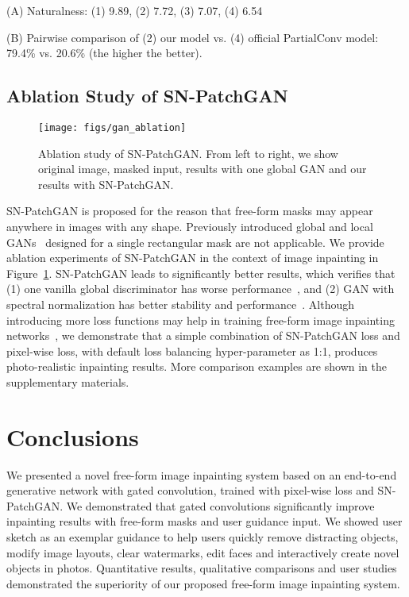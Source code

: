\documentclass[10pt,twocolumn,letterpaper]{article}
\begin{document}
(A) Naturalness: (1) 9.89, (2) 7.72, (3) 7.07, (4) 6.54

(B) Pairwise comparison of (2) our model vs. (4) official PartialConv model: 79.4\% vs. 20.6\% (the higher the better).

\subsection{Ablation Study of SN-PatchGAN}
\begin{figure}[ht]
  \centering
  \texttt{[image: figs/gan\_ablation]}
  \vspace{-6mm}
  \caption{Ablation study of SN-PatchGAN. From left to right, we show original image, masked input, results with one global GAN and our results with SN-PatchGAN.}
  \label{figs:gan_ablation}
\end{figure}

SN-PatchGAN is proposed for the reason that free-form masks may appear anywhere in images with any shape.
Previously introduced global and local GANs~\cite{iizuka2017globally} designed for a single rectangular mask are not applicable.
We provide ablation experiments of SN-PatchGAN in the context of image inpainting in Figure~\ref{figs:gan_ablation}.
SN-PatchGAN leads to significantly better results, which verifies that (1) one vanilla global discriminator has worse performance~\cite{iizuka2017globally}, and (2) GAN with spectral normalization has better stability and performance~\cite{miyato2018spectral}. Although introducing more loss functions may help in training free-form image inpainting networks~\cite{liu2018image}, we demonstrate that a simple combination of SN-PatchGAN loss and pixel-wise  loss, with default loss balancing hyper-parameter as \num{1}:\num{1}, produces photo-realistic inpainting results. More comparison examples are shown in the supplementary materials. 
\section{Conclusions}
We presented a novel free-form image inpainting system based on an end-to-end generative network with gated convolution, trained with pixel-wise  loss and SN-PatchGAN. We demonstrated that gated convolutions significantly improve inpainting results with free-form masks and user guidance input. We showed user sketch as an exemplar guidance to help users quickly remove distracting objects, modify image layouts, clear watermarks, edit faces and interactively create novel objects in photos. Quantitative results, qualitative comparisons and user studies demonstrated the superiority of our proposed free-form image inpainting system.
\end{document}
